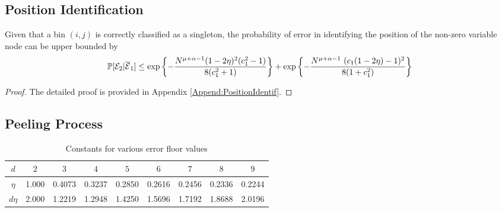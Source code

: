 \subsection{\bf Position Identification}
\begin{lemma}
Given that a bin $(i,j)$ is correctly classified as a singleton, the probability of error in identifying the position of the non-zero variable node can be upper bounded by
\begin{align*}
\mathbb{P}[\mathcal{E}_2|\overline{\mathcal{E}}_1]\leq \exp\left\lbrace-\frac{N^{\mu+\alpha-1}(1-2\eta)^2(c_1^2-1)}{8(c_1^2+1)}\right\rbrace + \exp\left\lbrace-\frac{N^{\mu+\alpha-1} ~ (c_1(1 - 2\eta) - 1)^2}{8(1+ c_1^2)}\right\rbrace
\end{align*}
\end{lemma}
\begin{proof}
	The detailed proof is provided in Appendix \ref{Append:PositionIdentif}.
\end{proof}

\subsection{\bf Peeling Process}
\begin{table}
\centering
\begin{tabular}{| c | c | c | c | c | c | c | c | c | }
\hline
$d$ & $2$& $3$ & $4$ & $5$ & $6$ & $7$ & $8$ & $9$ \\ \hline
$\eta$ & 1.000 & 0.4073 & 0.3237 & 0.2850 & 0.2616 & 0.2456 & 0.2336 & 0.2244 \\ \hline
 $d\eta$ & 2.000 & 1.2219 & 1.2948 & 1.4250 & 1.5696 & 1.7192 & 1.8688 & 2.0196 \\ \hline
\end{tabular}
\vspace{1ex}
\caption{Constants for various error floor values}
\label{Table:EtaValues}
\end{table}

